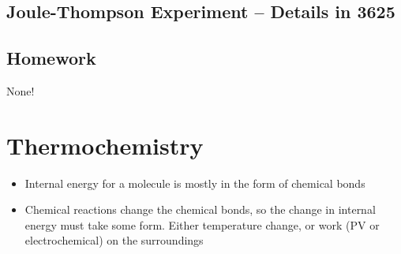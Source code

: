 \documentclass[12pt, openany, letterpaper]{memoir}
\begin{document}
\section*{Joule-Thompson Experiment -- Details in 3625}

\section*{Homework}
None!

\chapter{Thermochemistry}
\begin{itemize}
	\item Internal energy for a molecule is mostly in the form of chemical bonds
	\item Chemical reactions change the chemical bonds, so the change in internal energy must take some form. Either temperature change, or work (PV or electrochemical) on the surroundings
\end{itemize}
\end{document}
